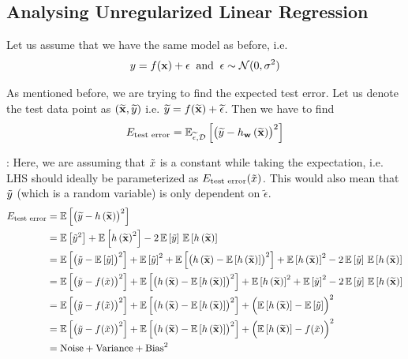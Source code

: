 \subsection{Analysing Unregularized Linear Regression}

Let us assume that we have the same model as before, i.e.
$$
  y = f(\x) + \epsilon \;\;\text{and}\;\; \epsilon \sim \mathcal{N}(0,\sigma^2)
$$

As mentioned before, we are trying to find the expected test error. Let us denote the test data point as $(\widetilde{\x},\widetilde{y})$ i.e. $\widetilde{y} = f(\widetilde{\x}) + \widetilde{\epsilon}$. Then we have to find
$$
  E_{\text{test error}} = \mathbb{E}_{\widetilde{\epsilon},\D}\left[\bigl(\widetilde{y} -h_\w\left(\widetilde{\x}\right)\bigr)^2\right]
$$

: Here, we are assuming that $\xt$ is a constant while taking the expectation, i.e. LHS should ideally be parameterized as $E_\text{test error}(\xt)$. This would also mean that $\yt$ (which is a random variable) is only dependent on $\widetilde{\epsilon}$.
\begin{align*}
  E_{\text{test error}} & = \mathbb{E}\left[\bigl(\widetilde{y} -h\left(\widetilde{\x}\right)\bigr)^2\right]                                                                \\
                        & = \expe{\yt^2} + \expe{\hxt^2} - 2 \, \expe{\yt} \, \expe{\hxt}                                                                                   \\
                        & = \expe{\bigl(\yt - \expe{\yt}\bigr)^2} + \expe{\yt}^2 + \expe{\bigl(\hxt - \expe{\hxt}\bigr)^2} + \expe{\hxt}^2 - 2 \, \expe{\yt} \, \expe{\hxt} \\
                        & = \expe{\bigl(\yt - f(\xt)\bigr)^2} + \expe{\bigl(\hxt - \expe{\hxt}\bigr)^2} + \expe{\hxt}^2  + \expe{\yt}^2 - 2 \, \expe{\yt} \, \expe{\hxt}    \\
                        & = \expe{\bigl(\yt - f(\xt)\bigr)^2} + \expe{\bigl(\hxt - \expe{\hxt}\bigr)^2} + \Bigl(\expe{\hxt}  - \expe{\yt}\Bigr)^2                           \\
                        & = \expe{\bigl(\yt - f(\xt)\bigr)^2} + \expe{\bigl(\hxt - \expe{\hxt}\bigr)^2} + \Bigl(\expe{\hxt}  - f(\xt)\Bigr)^2                               \\
                        & = \text{Noise} + \text{Variance} + \text{Bias}^2
\end{align*}

